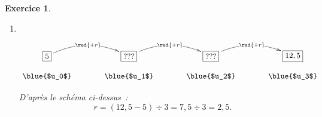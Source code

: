 \documentclass[10pt]{article}
\newtheorem{exo}{Exercice}
\begin{document}
\begin{exo}
\begin{enumerate}
\item ~{}\begin{center}
    $\xymatrix@R=0.5pc@C=3pc{
    *+[F]+{5} \ar@/^0.5cm/[r]|{\red{+r}} & 
    *+[F]+{???} \ar@/^0.5cm/[r]|{\red{+r}} & *+[F]+{???} \ar@/^0.5cm/[r]|{\red{+r}} & 
    *+[F]+{12,5} \\
    \txt{\blue{$u_0$}}&
    \txt{\blue{$u_1$}}&\txt{\blue{$u_2$}}&
    \txt{\blue{$u_3$}}
    }$
    \end{center}
    
    D'après le schéma ci-dessus~:
    \[r=(12,5-5)\div 3=7,5\div 3=2,5.\]
\end{enumerate}

\end{exo}
\end{document}
